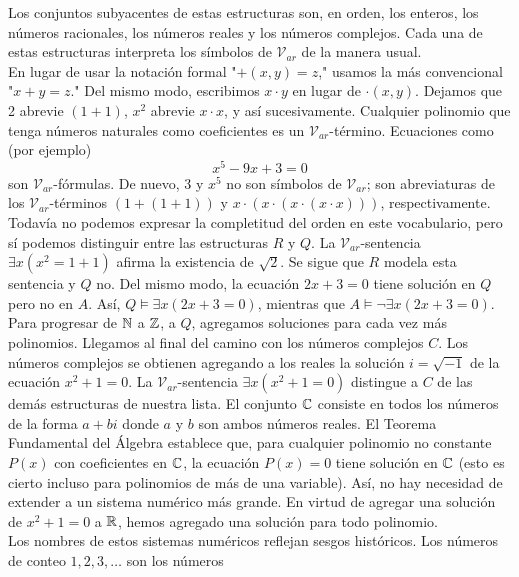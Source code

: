 \message{ !name(main.tex)}\documentclass[12pt,a4paper]{book}
\newcommand{\comillas}[1]{"#1"}
\newcommand{\VV}{\mathcal{V}}
\begin{document}
    Los conjuntos subyacentes de estas estructuras son, en orden, los enteros, los números racionales, los números reales y
    los números complejos. Cada una de estas estructuras interpreta los símbolos de $\VV_{ar}$ de la manera usual.\\
    En lugar de usar la notación formal \comillas{$+(x,y)=z$,} usamos la más convencional \comillas{$x+y=z$.} Del mismo
    modo, escribimos $x\cdot y$ en lugar de $\cdot(x,y)$. Dejamos que 2 abrevie $(1+1)$, $x^{2}$ abrevie $x\cdot x$, y así
    sucesivamente. Cualquier polinomio que tenga números naturales como coeficientes es un $\VV_{ar}$-término. Ecuaciones
    como (por ejemplo)
    \begin{equation*}
        x^{5}-9x+3=0
    \end{equation*}
    son $\VV_{ar}$-fórmulas. De nuevo, 3 y $x^{5}$ no son símbolos de $\VV_{ar}$; son abreviaturas de los $\VV_{ar}$-términos
    $(1+(1+1))$ y $x\cdot(x\cdot(x\cdot(x\cdot x)))$, respectivamente.\\
    Todavía no podemos expresar la completitud del orden en este vocabulario, pero sí podemos distinguir entre las
    estructuras $R$ y $Q$. La $\VV_{ar}$-sentencia $\exists x(x^{2}=1+1)$ afirma la existencia de $\sqrt{2}$. Se sigue que
    $R$ modela esta sentencia y $Q$ no. Del mismo modo, la ecuación $2x+3=0$ tiene solución en $Q$ pero no en $A$. Así,
    $Q\models\exists x(2x+3=0)$, mientras que $A\models\neg\exists x(2x+3=0)$.\\
    Para progresar de $\mathbb{N}$ a $\mathbb{Z}$, a $Q$, agregamos soluciones para cada vez más polinomios. Llegamos al final del camino
    con los números complejos $C$. Los números complejos se obtienen agregando a los reales la solución $i=\sqrt{-1}$ de la
    ecuación $x^{2}+1=0$. La $\VV_{ar}$-sentencia $\exists x(x^{2}+1=0)$ distingue a $C$ de las demás estructuras de nuestra
    lista. El conjunto $\mathbb{C}$ consiste en todos los números de la forma $a+bi$ donde $a$ y $b$ son ambos números reales. El
    Teorema Fundamental del Álgebra establece que, para cualquier polinomio no constante $P(x)$ con coeficientes en $\mathbb{C}$, la
    ecuación $P(x)=0$ tiene solución en $\mathbb{C}$ (esto es cierto incluso para polinomios de más de una variable). Así, no hay
    necesidad de extender a un sistema numérico más grande. En virtud de agregar una solución de $x^{2}+1=0$ a $\mathbb{R}$, hemos
    agregado una solución para todo polinomio.\\
    Los nombres de estos sistemas numéricos reflejan sesgos históricos. Los números de conteo $1,2,3,\dots$ son los números
\end{document}

